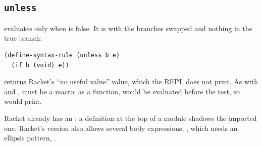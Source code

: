 \subsection{\texttt{unless}}

 evaluates  only when  is false. It is  with the branches swapped and nothing in the true branch:
\begin{lstlisting}
(define-syntax-rule (unless b e)
  (if b (void) e))
\end{lstlisting}
 returns Racket's ``no useful value'' value, which the REPL does not print. As with  and ,  must be a macro: as a function,  would be evaluated before the test, so  would print.

\begin{remark}
Racket already has an ; a definition at the top of a module shadows the imported one. Racket's version also allows several body expressions, , which needs an ellipsis pattern, .
\end{remark}
